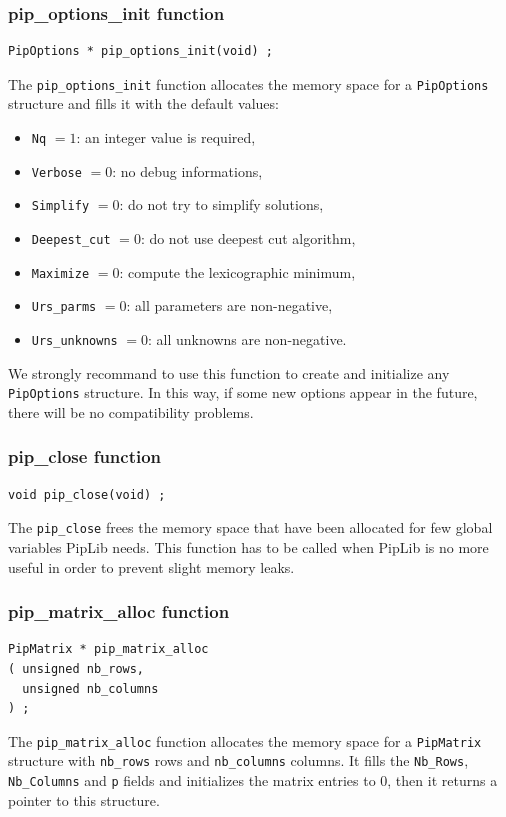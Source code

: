 \documentclass[12pt,a4paper]{article}
\begin{document}
\subsubsection{pip\_options\_init function}\label{optinit}
\begin{verbatim}
PipOptions * pip_options_init(void) ;
\end{verbatim}
The {\tt pip\_options\_init} function allocates the memory space for a
{\tt PipOptions} structure and fills it with the default values:
\begin{itemize}
\item {\tt Nq} $= 1$: an integer value is required,
\item {\tt Verbose} $= 0$: no debug informations,
\item {\tt Simplify} $= 0$: do not try to simplify solutions,
\item {\tt Deepest\_cut} $= 0$: do not use deepest cut algorithm,
\item {\tt Maximize} $= 0$: compute the lexicographic minimum,
\item \verb+Urs_parms+ $= 0$: all parameters are non-negative,
\item \verb+Urs_unknowns+ $= 0$: all unknowns are non-negative.
\end{itemize}
We strongly recommand to use this function to create and initialize any
{\tt PipOptions} structure. In this way, if some new options appear in
the future, there will be no compatibility problems.

\subsubsection{pip\_close function}
\begin{verbatim}
void pip_close(void) ;
\end{verbatim}
The {\tt pip\_close} frees the memory space that have been allocated for
few global variables PipLib needs. This function has to be called when
PipLib is no more useful in order to prevent slight memory leaks.

\subsubsection{pip\_matrix\_alloc function}
\begin{verbatim}
PipMatrix * pip_matrix_alloc
( unsigned nb_rows,
  unsigned nb_columns
) ;
\end{verbatim}
The {\tt pip\_matrix\_alloc} function allocates the memory space
for a {\tt PipMatrix} structure with {\tt nb\_rows} rows and {\tt nb\_columns}
columns. It fills the {\tt Nb\_Rows}, {\tt Nb\_Columns} and {\tt p} fields
and initializes the matrix entries to 0, then it returns a pointer to this
structure.
\end{document}
